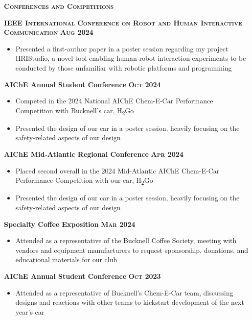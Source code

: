 \documentclass{article}
\newlength{\sectspaceabove}
\newlength{\sectspacebelow}
\newcommand{\textscbf}[1]{\textbf{\textsc{#1}}}
\newcommand{\resumesection}[1]{%
    \vspace{\sectspaceabove}%
    \begin{center}
        \textscbf{#1}
    \end{center}%
    \vspace{\sectspacebelow}%
}
\begin{document}
\resumesection{Conferences and Competitions}

\textscbf{IEEE International Conference on Robot and Human Interactive Communication} \hfill \textscbf{Aug 2024}
\begin{itemize}[noitemsep,topsep=2pt]
    \item Presented a first-author paper in a poster session regarding my project HRIStudio, a novel tool enabling human-robot interaction experiments to be conducted by those unfamiliar with robotic platforms and programming
\end{itemize}

\textbf{AIChE Annual Student Conference}  \hfill \textscbf{Oct 2024}
\begin{itemize}[noitemsep,topsep=2pt]
    \item Competed in the 2024 National AIChE Chem-E-Car Performance Competition with Bucknell's car, H\textsubscript{2}Go
    \item Presented the design of our car in a poster session, heavily focusing on the safety-related aspects of our design
\end{itemize}

\textbf{AIChE Mid-Atlantic Regional Conference}  \hfill \textscbf{Apr 2024}
\begin{itemize}[noitemsep,topsep=2pt]
    \item Placed second overall in the 2024 Mid-Atlantic AIChE Chem-E-Car Performance Competition with our car, H\textsubscript{2}Go
    \item Presented the design of our car in a poster session, heavily focusing on the safety-related aspects of our design
\end{itemize}

\textbf{Specialty Coffee Exposition}  \hfill \textscbf{Mar 2024}
\begin{itemize}[noitemsep,topsep=2pt]
    \item Attended as a representative of the Bucknell Coffee Society, meeting with vendors and equipment manufacturers to request sponsorship, donations, and educational materials for our club
\end{itemize}

\textbf{AIChE Annual Student Conference}  \hfill \textscbf{Oct 2023}
\begin{itemize}[noitemsep,topsep=2pt]
    \item Attended as a representative of Bucknell's Chem-E-Car team, discussing designs and reactions with other teams to kickstart development of the next year's car
\end{itemize}
\end{document}
